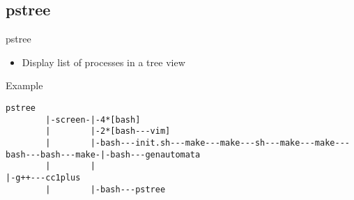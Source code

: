 \subsection{pstree}

\begin{frame}[fragile]{pstree}
  \begin{itemize}
    \pause \item Display list of processes in a tree view
  \end{itemize}
  \pause
  
  \begin{exampleblock}{Example}
    \begin{lstlisting}[showstringspaces=false]
pstree
        |-screen-|-4*[bash]
        |        |-2*[bash---vim]
        |        |-bash---init.sh---make---make---sh---make---make---bash---bash---make-|-bash---genautomata
        |        |                                                                      |-g++---cc1plus
        |        |-bash---pstree
    \end{lstlisting}
  \end{exampleblock}
\end{frame}
